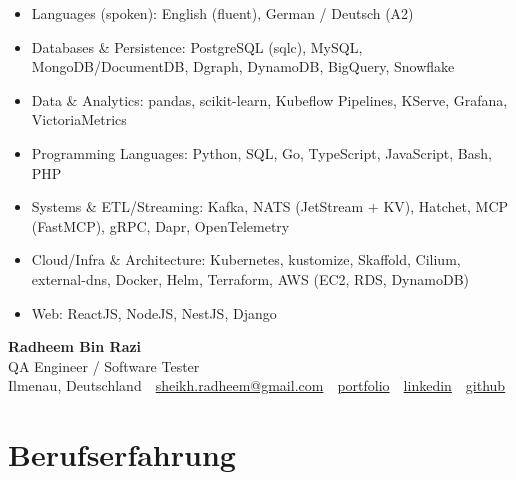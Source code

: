 \documentclass[10pt,a4paper]{resume}
\makeatletter
\newcommand{\Portfolio}{https://radheem.github.io/my-cv}
\newcommand{\PortfolioText}{portfolio}
\newcommand{\GitHub}{https://github.com/radheem}
\newcommand{\LinkedIn}{https://www.linkedin.com/in/radheem-razi}
\newcommand{\Email}{sheikh.radheem@gmail.com}
\makeatother
\begin{document}
\begin{itemize}[leftmargin=1.4em,nosep,topsep=2pt]
  \item Languages (spoken): English (fluent), German / Deutsch (A2)
  \item Databases \& Persistence: PostgreSQL (sqlc), MySQL, MongoDB/DocumentDB, Dgraph, DynamoDB, BigQuery, Snowflake
  \item Data \& Analytics: pandas, scikit-learn, Kubeflow Pipelines, KServe, Grafana, VictoriaMetrics
  \item Programming Languages: Python, SQL, Go, TypeScript, JavaScript, Bash, PHP
  \item Systems \& ETL/Streaming: Kafka, NATS (JetStream + KV), Hatchet, MCP (FastMCP), gRPC, Dapr, OpenTelemetry
  \item Cloud/Infra \& Architecture: Kubernetes, kustomize, Skaffold, Cilium, external-dns, Docker, Helm, Terraform, AWS (EC2, RDS, DynamoDB)
  \item Web: ReactJS, NodeJS, NestJS, Django
\end{itemize}

\clearpage
{}

\begin{center}
  {\huge\bfseries Radheem Bin Razi}\\[3pt]
  {\large QA Engineer / Software Tester}\\[6pt]
  \small
  Ilmenau, Deutschland \,\textbar\,
  \href{mailto:\Email}{\Email} \,\textbar\,
  \href{\Portfolio}{\PortfolioText} \,\textbar\,
  \href{\LinkedIn}{linkedin} \,\textbar\,
  \href{\GitHub}{github}
\end{center}
\vspace{2pt}

\section{Berufserfahrung}
\end{document}
